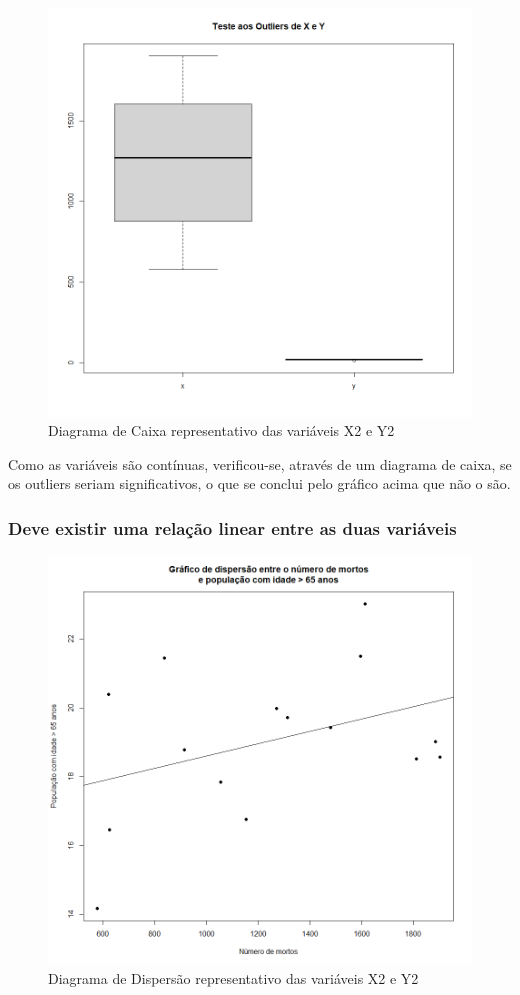 \documentclass[conference]{IEEEtran}
\begin{document}
\begin{figure}[htbp]
\centerline{\includegraphics[width=0.95\columnwidth]{images/03.b.1.png}}
\caption{Diagrama de Caixa representativo das variáveis X2 e Y2}
\label{fig}
\end{figure}

Como as variáveis são contínuas, verificou-se, através de um diagrama de caixa, se os outliers seriam significativos, o que se conclui pelo gráfico acima que não o são.

\subsubsection{Deve existir uma relação linear entre as duas variáveis}

\begin{figure}[htbp]
\centerline{\includegraphics[width=0.95\columnwidth]{images/03.b.2.png}}
\caption{Diagrama de Dispersão representativo das variáveis X2 e Y2}
\label{fig}
\end{figure}
\end{document}
